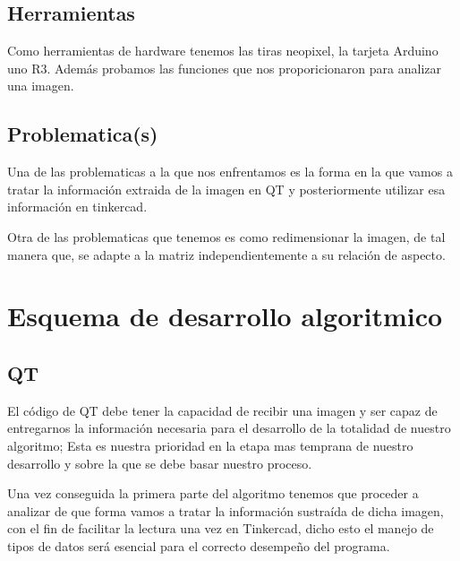 \documentclass{article}
\begin{document}
    \begin{flushleft}
    \subsection{Herramientas}
    Como herramientas de hardware tenemos las tiras neopixel, la tarjeta Arduino uno R3. Además probamos las funciones que nos proporicionaron para analizar una imagen. 
    \end{flushleft}
    \vspace*{0.5cm}
    \begin{flushleft}
    \subsection{Problematica(s)}
     Una de las problematicas a la que nos enfrentamos es la forma en la que vamos a tratar la información extraida de la imagen en QT y posteriormente utilizar esa información en tinkercad.
     
     \vspace*{0.1cm}
     
     Otra de las problematicas que tenemos es como redimensionar la imagen, de tal manera que, se adapte a la matriz independientemente a su relación de aspecto.   
    \end{flushleft}
    \vspace*{2cm}
    
    
\section{Esquema de desarrollo algoritmico}
\label{esquema}
    \begin{flushleft}
        
    \subsection{QT}
    El código de QT debe tener la capacidad de recibir una imagen y ser capaz de entregarnos la información necesaria para el desarrollo de la totalidad de nuestro algoritmo; Esta es nuestra prioridad en la etapa mas temprana de nuestro desarrollo y sobre la que se debe basar nuestro proceso.
    \end{flushleft}

    \begin{flushleft}
    Una vez conseguida la primera parte del algoritmo tenemos que proceder a analizar de que forma vamos a tratar la información sustraída de dicha imagen, con el fin de facilitar la lectura una vez en Tinkercad, dicho esto el manejo de tipos de datos será esencial para el correcto desempeño del programa.
    \end{flushleft}
    \vspace*{0.5cm}
    
\end{document}
